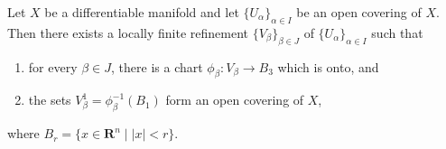 Let $X$ be a differentiable manifold and let $\{U_{\alpha}\}_{\alpha \in I}$ be an open covering of $X$. Then there exists a locally finite refinement $\{V_{\beta}\}_{\beta \in J}$ of $\{U_{\alpha}\}_{\alpha \in I}$ such that

\begin{enumerate}
    \item[(a)] for every $\beta \in J$, there is a chart $\phi_{\beta}: V_{\beta} \rightarrow B_3$ which is onto, and
    \item[(b)] the sets $V_{\beta}^1 = \phi_{\beta}^{-1}(B_1)$ form an open covering of $X$,
\end{enumerate}

where $B_r = \{x \in \mathbf{R}^n \mid |x| < r\}$.
